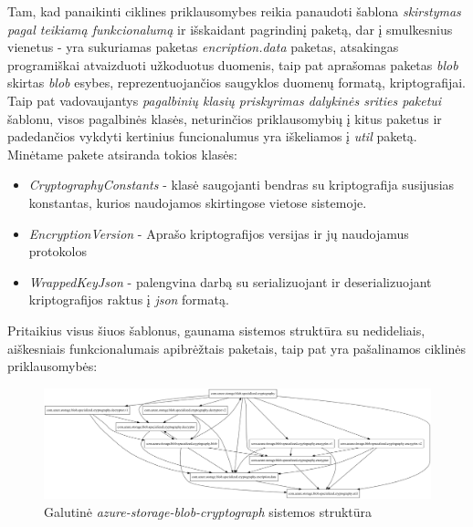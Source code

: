 Tam, kad panaikinti ciklines priklausomybes reikia panaudoti šablona \textit{skirstymas pagal teikiamą funkcionalumą} ir išskaidant pagrindinį paketą,
dar į smulkesnius vienetus - yra sukuriamas paketas \textit{encription.data} paketas, atsakingas programiškai atvaizduoti užkoduotus duomenis, taip pat
aprašomas paketas \textit{blob} skirtas \textit{blob} esybes, reprezentuojančios saugyklos duomenų formatą, kriptografijai.
Taip pat vadovaujantys \textit{pagalbinių klasių priskyrimas dalykinės srities paketui} šablonu, visos pagalbinės klasės, neturinčios priklausomybių į kitus paketus ir
padedančios vykdyti kertinius funcionalumus yra iškeliamos į \textit{util} paketą.
Minėtame pakete atsiranda tokios klasės:
\begin{itemize}
    \item \textit{CryptographyConstants} - klasė saugojanti bendras su kriptografija susijusias konstantas, kurios naudojamos skirtingose vietose sistemoje.
    \item \textit{EncryptionVersion} - Aprašo kriptografijos versijas ir jų naudojamus protokolos
    \item \textit{WrappedKeyJson} - palengvina darbą su serializuojant ir deserializuojant kriptografijos raktus į \textit{json} formatą.
\end{itemize}

Pritaikius visus šiuos šablonus, gaunama sistemos struktūra su nedideliais, aiškesniais funkcionalumais apibrėžtais paketais, taip pat yra pašalinamos ciklinės priklausomybės:
\begin{figure}[H]
    \centering
    \includegraphics[scale=0.35]{img/azure_packages_v2}
    \caption{Galutinė \textit{azure-storage-blob-cryptograph} sistemos struktūra}
    \label{img:azure_packages_v2}
\end{figure}

